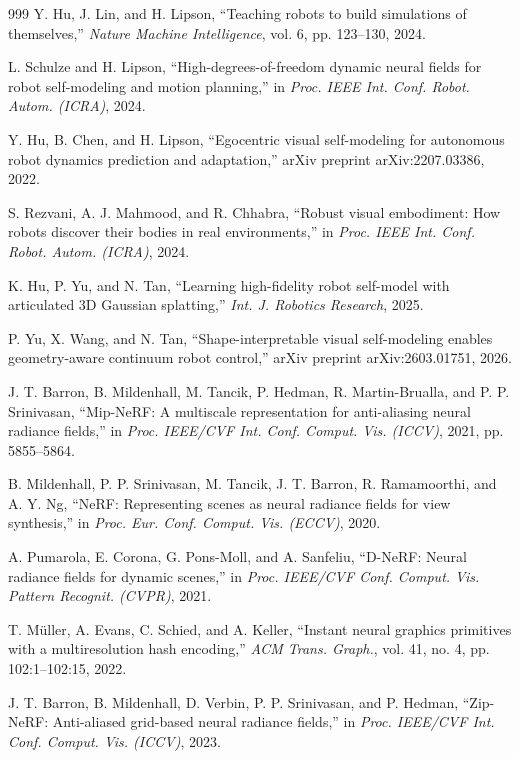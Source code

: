 \documentclass[12pt,a4paper,oneside]{report}
\begin{document}
\begin{thebibliography}{999}
Y. Hu, J. Lin, and H. Lipson, ``Teaching robots to build simulations of themselves,'' \textit{Nature Machine Intelligence}, vol. 6, pp. 123--130, 2024.

L. Schulze and H. Lipson, ``High-degrees-of-freedom dynamic neural fields for robot self-modeling and motion planning,'' in \textit{Proc. IEEE Int. Conf. Robot. Autom. (ICRA)}, 2024.

Y. Hu, B. Chen, and H. Lipson, ``Egocentric visual self-modeling for autonomous robot dynamics prediction and adaptation,'' arXiv preprint arXiv:2207.03386, 2022.

S. Rezvani, A. J. Mahmood, and R. Chhabra, ``Robust visual embodiment: How robots discover their bodies in real environments,'' in \textit{Proc. IEEE Int. Conf. Robot. Autom. (ICRA)}, 2024.

K. Hu, P. Yu, and N. Tan, ``Learning high-fidelity robot self-model with articulated {3D} Gaussian splatting,'' \textit{Int. J. Robotics Research}, 2025.

P. Yu, X. Wang, and N. Tan, ``Shape-interpretable visual self-modeling enables geometry-aware continuum robot control,'' arXiv preprint arXiv:2603.01751, 2026.

J. T. Barron, B. Mildenhall, M. Tancik, P. Hedman, R. Martin-Brualla, and P. P. Srinivasan, ``{Mip-NeRF}: A multiscale representation for anti-aliasing neural radiance fields,'' in \textit{Proc. IEEE/CVF Int. Conf. Comput. Vis. (ICCV)}, 2021, pp. 5855--5864.

B. Mildenhall, P. P. Srinivasan, M. Tancik, J. T. Barron, R. Ramamoorthi, and A. Y. Ng, ``NeRF: Representing scenes as neural radiance fields for view synthesis,'' in \textit{Proc. Eur. Conf. Comput. Vis. (ECCV)}, 2020.

A. Pumarola, E. Corona, G. Pons-Moll, and A. Sanfeliu, ``D-NeRF: Neural radiance fields for dynamic scenes,'' in \textit{Proc. IEEE/CVF Conf. Comput. Vis. Pattern Recognit. (CVPR)}, 2021.

T. M\"uller, A. Evans, C. Schied, and A. Keller, ``Instant neural graphics primitives with a multiresolution hash encoding,'' \textit{ACM Trans. Graph.}, vol. 41, no. 4, pp. 102:1--102:15, 2022.

J. T. Barron, B. Mildenhall, D. Verbin, P. P. Srinivasan, and P. Hedman, ``Zip-NeRF: Anti-aliased grid-based neural radiance fields,'' in \textit{Proc. IEEE/CVF Int. Conf. Comput. Vis. (ICCV)}, 2023.


\end{thebibliography}
\end{document}
